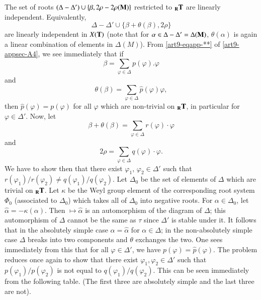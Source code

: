 The set of roots $(\Delta - \Delta' ) \cup \{\beta, 2 \rho - 2 \rho (\mathbf{M})\}$ restricted to ${}_{\mathbf{R}} \mathbf{T}$ are linearly independent. Equivalently,
$$
\Delta - \Delta' \cup \{\beta + \theta (\beta), 2\rho\}
$$
are linearly independent in $X(\mathbf{T})$ (note that for $\alpha \in \Delta - \Delta' = \Delta (\mathbf{M})$, $\theta(\alpha)$ is again a linear combination of elements in $\Delta (M)$). From \ref{art9-eqapp-**} of \ref{art9-appsec-A4}, we see immediately that if 
$$
\beta = \sum\limits_{\varphi \in \Delta} p (\varphi) . \varphi
$$\pageoriginale 
and 
$$
\theta (\beta) = \sum\limits_{\varphi \in \Delta} \hat{p} (\varphi) \varphi,
$$
then $\hat{p}(\varphi) = p (\varphi)$ for all $\varphi$ which are non-trivial on ${}_{\mathbf{R}}\mathbf{T}$, in particular for $\varphi \in \Delta'$. Now, let
$$
\beta + \theta (\beta) = \sum\limits_{\varphi \in \Delta} r (\varphi)\cdot \varphi
$$
and 
$$
2 \rho = \sum\limits_{\varphi \in \Delta} q (\varphi) \cdot \varphi.
$$
We have to show then that there exist $\varphi_1$, $\varphi_2 \in \Delta'$ such that $r(\varphi_1)/ r (\varphi_2) \neq q (\varphi_1)/ q(\varphi_2)$. Let $\Delta_0$ be the set of elements of $\Delta$ which are trivial on ${}_{\mathbf{R}}\mathbf{T}$. Let $\kappa$ be the Weyl group element of the corresponding root system $\Phi_0$ (associated to $\Delta_0$) which takes all of $\Delta_0$ into negative roots. For $\alpha \in \Delta_0$, let $\hat{\alpha} = -\kappa (\alpha)$. Then $\longmapsto \hat{\alpha}$ is an automorphism of the diagram of $\Delta$; this automorphism of $\Delta$ cannot be the same as $\tau$  since $\Delta'$ is stable under it. It follows that in the absolutely simple case $\alpha = \hat{\alpha}$ for $\alpha \in \Delta$; in the non-absolutely simple case $\Delta$ breaks into two components and $\theta$ exchanges the two. One sees immediately from this that for all $\varphi \in \Delta'$, we have $p(\varphi) = \hat{p}(\varphi)$. The problem reduces once again to show that there exist $\varphi_1, \varphi_2 \in \Delta'$ such that $p(\varphi_1) / p (\varphi_2)$ is not equal to $q(\varphi_1)/q(\varphi_2)$. This can be seen immediately from the following table. (The first three are absolutely simple and the last three are not).
